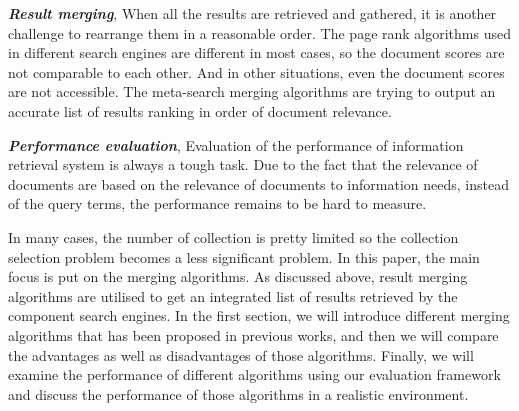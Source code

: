  \textbf{\emph{Result merging}},
 When all the results are retrieved and gathered, it is another challenge to rearrange them in a reasonable order. The page rank algorithms used in different search engines are different in most cases, so the document scores are not comparable to each other. And in other situations, even the document scores are not accessible. The meta-search merging algorithms are trying to output an accurate list of results ranking in order of document relevance.
 
 \textbf{\emph{Performance evaluation}},
 Evaluation of the performance of information retrieval system is always a tough task. Due to the fact that the relevance of documents are based on the relevance of documents to information needs, instead of the query terms, the performance remains to be hard to measure.
 
 In many cases, the number of collection is pretty limited so the collection selection problem becomes a less significant problem. In this paper, the main focus is put on the merging algorithms. As discussed above, result merging algorithms are utilised to get an integrated list of results retrieved by the component search engines. In the first section, we will introduce different merging algorithms that has been proposed in previous works, and then we will compare the advantages as well as disadvantages of those algorithms. Finally, we will examine the performance of different algorithms using our evaluation framework and discuss the performance of those algorithms in a realistic environment.
 